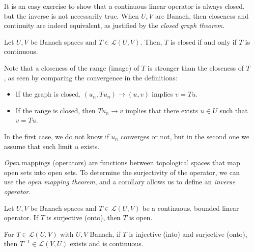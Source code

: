 It is an easy exercise to show that a continuous linear operator is always closed, but the inverse is not necessarily true. When $U, V$ are Banach, then closeness and continuity are indeed equivalent, as justified by the \emph{closed graph theorem}. 
\begin{theorem}\label{thm:closed-graph-theorem}
    Let $U,V$ be Banach spaces and $T\in\mathcal{L}(U,V)$. Then, $T$ is closed if and only if $T$ is continuous. 
\end{theorem}

Note that a closeness of the range (image) of $T$ is stronger than the closeness of $T$, as seen by comparing the convergence in the definitions: 
\begin{itemize}
    \item If the graph is closed, $(u_n, Tu_n)\to (u,v)$ implies $v=Tu$.
    \item If the range is closed, then $Tu_n\to v$ implies that there exists $u\in U$ such that $v=Tu$. 
\end{itemize}
In the first case, we do not know if $u_n$ converges or not, but in the second one we assume that such limit $u$ exists. 

\emph{Open} mappings (operators) are functions between topological spaces that map open sets into open sets. To determine the surjectivity of the operator, we can use the \emph{open mapping theorem}, and a corollary allows us to define an \emph{inverse operator}.

\begin{theorem}\label{thm:open-mapping-theorem}
    Let $U,V$ be Banach spaces and $T\in \mathcal{L}(U,V)$ be a continuous, bounded linear operator. If $T$ is surjective (onto), then $T$ is open. 
\end{theorem}
\begin{corollary}
    For $T\in\mathcal{L}(U,V)$ with $U,V$ Banach, if $T$ is injective (into) and surjective (onto), then $T^{-1}\in \mathcal{L}(V,U)$ exists and is continuous. 
\end{corollary}

